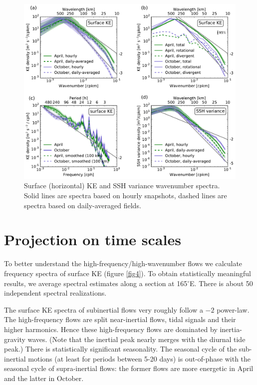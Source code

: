 \documentclass[grl]{agutex2015}
\begin{document}
\begin{article}
\begin{figure}[ht]
  \begin{center}
    \includegraphics[width=.9\textwidth]{figs/fig3.pdf}
 \caption{Surface (horizontal) KE and SSH variance wavenumber spectra. Solid lines
 are spectra based on hourly snapshots, dashed lines are spectra based on daily-averaged
 fields.}
 \label{fig3}
 \end{center}
\end{figure}

\section{Projection on time scales}
To better understand the high-frequency/high-wavenumber flows  we calculate frequency
spectra of surface KE (figure \ref{fig4}). To obtain statistically meaningful results,
we average spectral estimates along a section at 165$^\circ$E.  There is about 50
independent spectral realizations.

The surface KE spectra of subinertial flows very roughly follow a $-2$ power-law.
The high-frequency flows are split near-inertial flows, tidal signals and their
higher harmonics. Hence these high-frequency flows are dominated by inertia-gravity
waves. (Note that the inertial peak nearly merges with the
diurnal tide peak.) There is statistically significant seasonality. The seasonal
cycle of the sub-inertial motions (at least for periods between 5-20 days)
is out-of-phase with the seasonal cycle of supra-inertial flows: the former flows
are more energetic in April and the latter in October.


\end{article}
\end{document}
